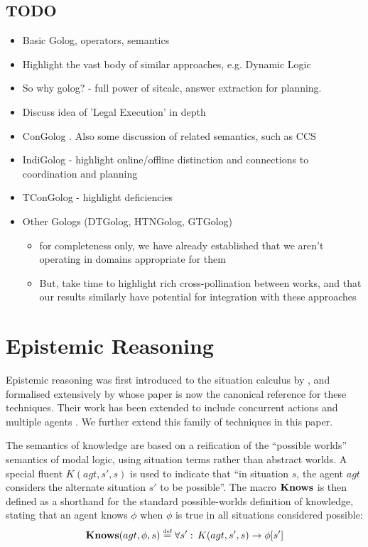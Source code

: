 \subsection{TODO}

\begin{itemize}
\item Basic Golog, operators, semantics \cite{levesque97golog} 
\item Highlight the vast body of similar approaches, e.g. Dynamic Logic 
\item So why golog? - full power of sitcalc, answer extraction for planning. 
\item Discuss idea of 'Legal Execution' in depth 
\item ConGolog \cite{giacomo00congolog}. Also some discussion of related
semantics, such as CCS 
\item IndiGolog - highlight online/offline distinction and connections to
coordination and planning \cite{giacomo99indigolog} 
\item TConGolog - highlight deficiencies \cite{pinto99tcongolog} 
\item Other Gologs (DTGolog, HTNGolog, GTGolog)

\begin{itemize}
\item for completeness only, we have already established that we aren't
operating in domains appropriate for them 
\item But, take time to highlight rich cross-pollination between works,
and that our results similarly have potential for integration with
these approaches 
\end{itemize}
\end{itemize}

\section{Epistemic Reasoning}

Epistemic reasoning was first introduced to the situation calculus
by \cite{moore80know_act}, and formalised extensively by \cite{scherl03sc_knowledge}
whose paper is now the canonical reference for these techniques. Their
work has been extended to include concurrent actions \cite{scherl03conc_knowledge}
and multiple agents \cite{shapiro98specifying_ma_systems}. We further
extend this family of techniques in this paper.

The semantics of knowledge are based on a reification of the {}``possible
worlds'' semantics of modal logic, using situation terms rather than
abstract worlds. A special fluent $K(agt,s',s)$ is used to indicate
that {}``in situation $s$, the agent $agt$ considers the alternate
situation $s'$ to be possible''. The macro $\mathbf{Knows}$ is then defined
as a shorthand for the standard possible-worlds definition of knowledge,
stating that an agent knows $\phi$ when $\phi$ is true in all situations
considered possible: \begin{equation}
\mathbf{Knows}(agt,\phi,s)\stackrel{\mbox{\tiny def}}{=}\forall s':\, K(agt,s',s)\rightarrow\phi[s']\label{eqn:knows_def}\end{equation}


